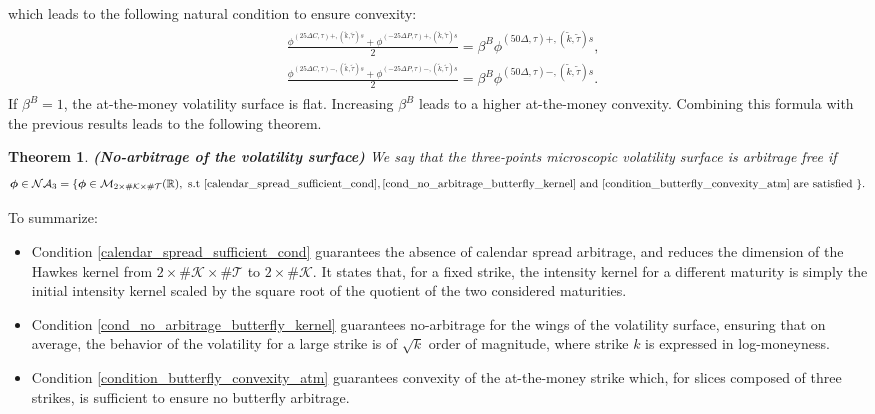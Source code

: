 \documentclass[12pt]{article}
\newtheorem{theorem}{Theorem}
\begin{document}
which leads to the following natural condition to ensure convexity:
\begin{align}\label{condition_butterfly_convexity_atm}
\begin{split}
    &\frac{\phi^{(25\Delta C,\tau)+,(\tilde k,\tilde \tau)s} + \phi^{(-25\Delta P,\tau)+,(\tilde k,\tilde \tau)s}}{2} = \beta^B \phi^{(50\Delta ,\tau)+,(\tilde k,\tilde \tau)s}, \\
    & \frac{\phi^{(25\Delta C,\tau)-,(\tilde k,\tilde \tau)s} + \phi^{(-25\Delta P,\tau)-,(\tilde k,\tilde \tau)s}}{2} = \beta^B \phi^{(50\Delta ,\tau)-,(\tilde k,\tilde \tau)s}.    
\end{split}
\end{align}
If $\beta^B = 1$, the at-the-money volatility surface is flat. Increasing $\beta^B$ leads to a higher at-the-money convexity. Combining this formula with the previous results leads to the following theorem.
\begin{theorem}\label{thm_no_arbitrage}
\textbf{(No-arbitrage of the volatility surface)} We say that the three-points microscopic volatility surface is arbitrage free if 
\begin{align*}%
    \boldsymbol{\phi} \in \mathcal{NA}_3= \{\boldsymbol{\phi}\in \mathcal{M}_{2\times \#\mathcal{K}\times\#\mathcal{T}}(\mathbb{R}), \text{ s.t } \eqref{calendar_spread_sufficient_cond},\eqref{cond_no_arbitrage_butterfly_kernel} \text{ and } \eqref{condition_butterfly_convexity_atm}\text{ are satisfied }  \}.
\end{align*}
\end{theorem}
To summarize:
\begin{itemize}
    \item Condition \eqref{calendar_spread_sufficient_cond} guarantees the absence of calendar spread arbitrage, and reduces the dimension of the Hawkes kernel from $2\times \#\mathcal{K}\times\#\mathcal{T}$ to $2\times \#\mathcal{K}$. It states that, for a fixed strike, the intensity kernel for a different maturity is simply the initial intensity kernel scaled by the square root of the quotient of the two considered maturities. 
    \item Condition \eqref{cond_no_arbitrage_butterfly_kernel} guarantees no-arbitrage for the wings of the volatility surface, ensuring that on average, the behavior of the volatility for a large strike is of $\sqrt{k}$  order of magnitude, where strike $k$ is expressed in log-moneyness. 
    \item Condition \eqref{condition_butterfly_convexity_atm} guarantees convexity of the at-the-money strike which, for slices composed of three strikes, is sufficient to ensure no butterfly arbitrage. 
\end{itemize}
\end{document}
